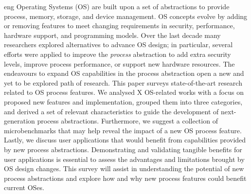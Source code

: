 \begin{resumo}{eng}
Operating Systems (OS) are built upon a set of abstractions to provide process,
memory, storage, and device management. OS concepts evolve by
adding or removing features to meet changing requirements in security, performance,
hardware support, and programming models. Over the last decade many researchers
explored alternatives to advance OS design; in particular, several efforts were
applied to improve the \emph{process} abstraction to add extra security
levels, improve process performance, or support new hardware
resources. The endeavours to expand OS capabilities in the process abstraction
open a new and yet to be explored path of research. This paper surveys
state-of-the-art research related to OS process features. We analysed X OS-related works
with a focus on proposed new features and implementation, grouped them into
three categories, and derived a set of relevant characteristics to guide the
development of next-generation process abstractions. Furthermore, we suggest a
collection of microbenchmarks that may help reveal the impact of a new OS
process feature. Lastly, we discuss user applications that
would benefit from capabilities provided by new process
abstractions. Demonstrating and validating tangible benefits for user applications
is essential to assess the advantages and  limitations brought by OS
design changes. This survey will assist in understanding the potential of new
process abstractions and explore how and why new process features could benefit
current OSes.

\end{resumo}



